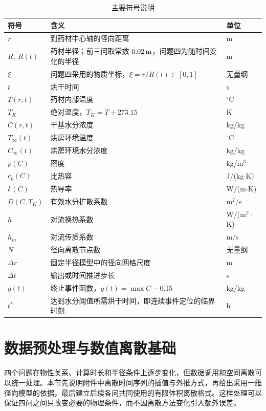 \documentclass[UTF8,a4paper,12pt]{ctexart}
\numberwithin{equation}{section}
\begin{document}
\begin{table}[H]
  \centering
  \caption{主要符号说明}
  \label{tab:symbols}
  \begin{tabular}{>{\centering\arraybackslash}p{}p{}>{\centering\arraybackslash}p{}}
    \toprule
    符号 & 含义 & 单位\\ \midrule
    $r$ & 到药材中心轴的径向距离 & m\\
    $R,\ R(t)$ & 药材半径；前三问取常数 $0.02\rm\,m$，问题四为随时间变化的半径 & m\\
    $\xi$ & 问题四采用的物质坐标，$\xi=r/R(t)\in[0,1]$ & 无量纲\\
    $t$ & 烘干时间 & s\\
    $T(r,t)$ & 药材内部温度 & $^\circ\mathrm C$\\
    $T_K$ & 绝对温度，$T_K=T+273.15$ & K\\
    $C(r,t)$ & 干基水分浓度 & kg/kg\\
    $T_\infty(t)$ & 烘房环境温度 & $^\circ\mathrm C$\\
    $C_\infty(t)$ & 烘房环境水分浓度 & kg/kg\\
    $\rho(C)$ & 密度 & kg/m$^3$\\
    $c_p(C)$ & 比热容 & J/(kg$\cdot$K)\\
    $k(C)$ & 热导率 & W/(m$\cdot$K)\\
    $D(C,T_K)$ & 有效水分扩散系数 & m$^2$/s\\
    $h$ & 对流换热系数 & W/(m$^2\cdot$K)\\
    $h_m$ & 对流传质系数 & m/s\\
    $N$ & 径向离散节点数 & 无量纲\\
    $\Delta r$ & 固定半径模型中的径向网格尺度 & m\\
    $\Delta t$ & 输出或时间推进步长 & s\\
    $g(t)$ & 终止事件函数，$g(t)=\max C-0.15$ & kg/kg\\
    $t^*$ & 达到水分阈值所需烘干时间，即连续事件定位的临界时刻 & h\\
    \bottomrule
  \end{tabular}
\end{table}

\section{数据预处理与数值离散基础}
四个问题在物性关系、计算时长和半径条件上逐步变化，但数据调用和空间离散可以统一处理。本节先说明附件中离散时间序列的插值与外推方式，再给出采用一维径向模型的依据，最后建立后续各问共同使用的有限体积离散格式。这样处理可以保证四问之间只改变必要的物理条件，而不因离散方法变化引入额外误差。
\end{document}
